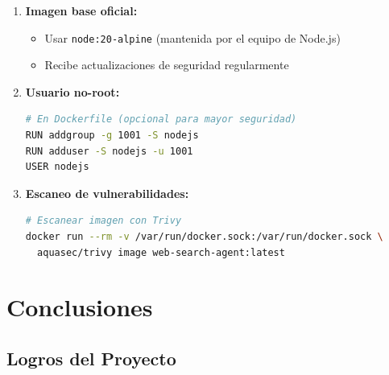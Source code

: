 \documentclass[12pt,a4paper]{article}
\begin{document}
\begin{enumerate}
    \item \textbf{Imagen base oficial:}
    \begin{itemize}
        \item Usar \texttt{node:20-alpine} (mantenida por el equipo de Node.js)
        \item Recibe actualizaciones de seguridad regularmente
    \end{itemize}

    \item \textbf{Usuario no-root:}
    \begin{lstlisting}[language=bash]
# En Dockerfile (opcional para mayor seguridad)
RUN addgroup -g 1001 -S nodejs
RUN adduser -S nodejs -u 1001
USER nodejs
    \end{lstlisting}

    \item \textbf{Escaneo de vulnerabilidades:}
    \begin{lstlisting}[language=bash]
# Escanear imagen con Trivy
docker run --rm -v /var/run/docker.sock:/var/run/docker.sock \
  aquasec/trivy image web-search-agent:latest
    \end{lstlisting}
\end{enumerate}

\newpage

\section{Conclusiones}

\subsection{Logros del Proyecto}
\end{document}
